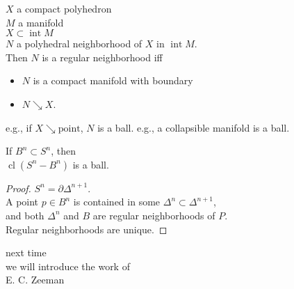 \documentclass[14pt]{beamer}
\newcommand{\collapses}{\searrow}
\DeclareMathOperator{\cl}{cl}
\DeclareMathOperator{\interior}{int}
\newcommand{\setbackgroundpicture}[1]{%
\usebackgroundtemplate{
\begin{pgfpicture}{0in}{0in}{\paperwidth}{\paperheight}
\pgfputat{\pgfxy(0,0)}{\texttt{[image: \#1]}}
\color{white}
\pgfsetfillopacity{0.8}
\pgfrect[fill]{\pgfxy(0,0)}{\pgfpoint{\paperwidth}{\paperheight}}
\end{pgfpicture}
}
}
\newcommand{\clearbackgroundpicture}{\usebackgroundtemplate{}}
\begin{document}
\begin{frame}
  \begin{theorem}
    $X$ a compact polyhedron \\
    $M$ a manifold \\
    $X \subset \interior M$ \\
    $N$ a polyhedral neighborhood of $X$ in $\interior M$. \\
    Then $N$ is a regular neighborhood iff
    \begin{itemize}
    \item $N$ is a compact manifold with boundary
    \item $N \collapses X$.
    \end{itemize}
  \end{theorem}

  \vfill\pause
  e.g., if $X \collapses \mbox{point}$, $N$ is a ball.
  \vfill\pause
  e.g., a collapsible manifold is a ball.
\end{frame}


\clearbackgroundpicture

\begin{frame}
  \begin{corollary}
    If $B^n \subset S^n$, then \\
    $\cl(S^n - B^n)$ is a ball.
  \end{corollary}

  \pause
  \begin{proof}
    $S^n = \partial \Delta^{n+1}$. \\
    A point $p \in B^n$ is contained in some $\Delta^n \subset
    \Delta^{n+1}$, \\
    and both $\Delta^n$ and $B$ are regular neighborhoods of $P$. \\
    Regular neighborhoods are unique.
  \end{proof}
\end{frame}

\begin{frame}
 \vfill
  \begin{center}
    next time \\
    we will introduce the work of \\
    \Huge E. C. Zeeman
  \end{center}
  \vfill
\end{frame}
\end{document}
